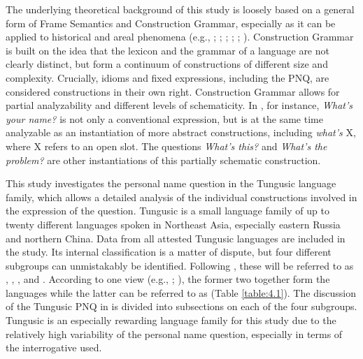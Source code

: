 \documentclass[output=paper,colorlinks,citecolor=brown]{langscibook}
\begin{document}
The underlying theoretical background of this study is loosely based on a general form of Frame Semantics and Construction Grammar, especially as it can be applied to historical and areal phenomena (e.g., \citealt{Fillmore1985}; \citealt{Langacker2008}; \citealt{Hilpert2014}; \citealt{Trousdale2014}; \citealt{Lefebvre2015}; \citealt{Hölzl2018c}). Construction Grammar is built on the idea that the lexicon and the grammar of a language are not clearly distinct, but form a continuum of constructions of different size and complexity. Crucially, idioms and fixed expressions, including the PNQ, are considered constructions in their own right. Construction Grammar allows for partial analyzability and different levels of schematicity. In , for instance, \textit{What’s your name?} is not only a conventional expression, but is at the same time analyzable as an instantiation of more abstract constructions, including \textit{what’s} X, where X refers to an open slot. The questions \textit{What’s this?} and \textit{What’s the problem?} are other instantiations of this partially schematic construction.

This study investigates the personal name question in the Tungusic language family, which allows a detailed analysis of the individual constructions involved in the expression of the question. Tungusic is a small language family of up to twenty different languages spoken in Northeast Asia, especially eastern Russia and northern China. Data from all attested Tungusic languages are included in the study. Its internal classification is a matter of dispute, but four different subgroups can unmistakably be identified. Following \citet{Janhunen2012a}, these will be referred to as , , , and . According to one view (e.g., \citealt{Georg2004}; \citealt{Janhunen2012a}), the former two together form the  languages while the latter can be referred to as  (Table \ref{table:4.1}). The discussion of the Tungusic PNQ in  is divided into subsections on each of the four subgroups. Tungusic is an especially rewarding language family for this study due to the relatively high variability of the personal name question, especially in terms of the interrogative used.
\end{document}
